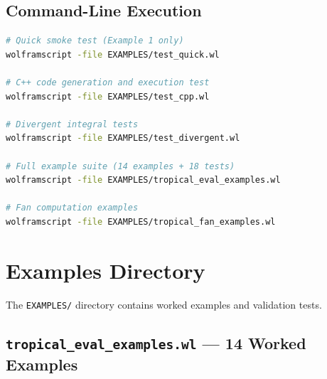 \documentclass[11pt,a4paper]{article}
\begin{document}
\subsection{Command-Line Execution}

\begin{lstlisting}[language=bash]
# Quick smoke test (Example 1 only)
wolframscript -file EXAMPLES/test_quick.wl

# C++ code generation and execution test
wolframscript -file EXAMPLES/test_cpp.wl

# Divergent integral tests
wolframscript -file EXAMPLES/test_divergent.wl

# Full example suite (14 examples + 18 tests)
wolframscript -file EXAMPLES/tropical_eval_examples.wl

# Fan computation examples
wolframscript -file EXAMPLES/tropical_fan_examples.wl
\end{lstlisting}

\section{Examples Directory}

The \texttt{EXAMPLES/} directory contains worked examples and validation tests.

\subsection*{\texttt{tropical\_eval\_examples.wl} --- 14 Worked Examples}
\end{document}
